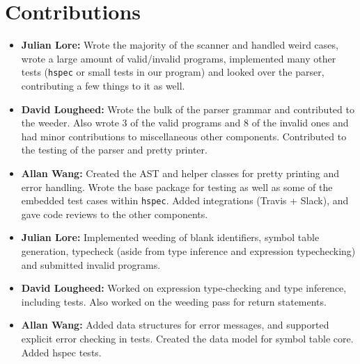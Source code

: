 \documentclass[11pt]{article}
\begin{document}
\section{Contributions}
\begin{itemize}
	\item \textbf{Julian Lore:} Wrote the majority of the scanner and handled weird
	      cases, wrote a large amount of valid/invalid programs, implemented
	      many other tests (\texttt{hspec} or small tests in our program) and looked
	      over the parser, contributing a few things to it as well.
	\item \textbf{David Lougheed:} Wrote the bulk of the parser grammar and contributed to
	      the weeder. Also wrote 3 of the valid programs and 8 of the
	      invalid ones and had minor contributions to miscellaneous other components.
	      Contributed to the testing of the parser and pretty printer.
	\item \textbf{Allan Wang:} Created the AST and helper classes for pretty printing
	      and error handling.  Wrote the base package for testing as well as
	      some of the embedded test cases within \texttt{hspec}.  Added integrations
	      (Travis + Slack), and gave code reviews to the other components.
\end{itemize}
\begin{itemize}
	\item \textbf{Julian Lore:} Implemented weeding of blank identifiers, symbol
	      table generation, typecheck (aside from type inference and
	      expression typechecking) and submitted invalid programs.
	\item \textbf{David Lougheed:} Worked on expression type-checking and type inference,
	      including tests. Also worked on the weeding pass for return
	      statements.
	\item \textbf{Allan Wang:} Added data structures for error messages, and supported
	      explicit error checking in tests. Created the data model for
	      symbol table core. Added hspec tests.
\end{itemize}
\end{document}
